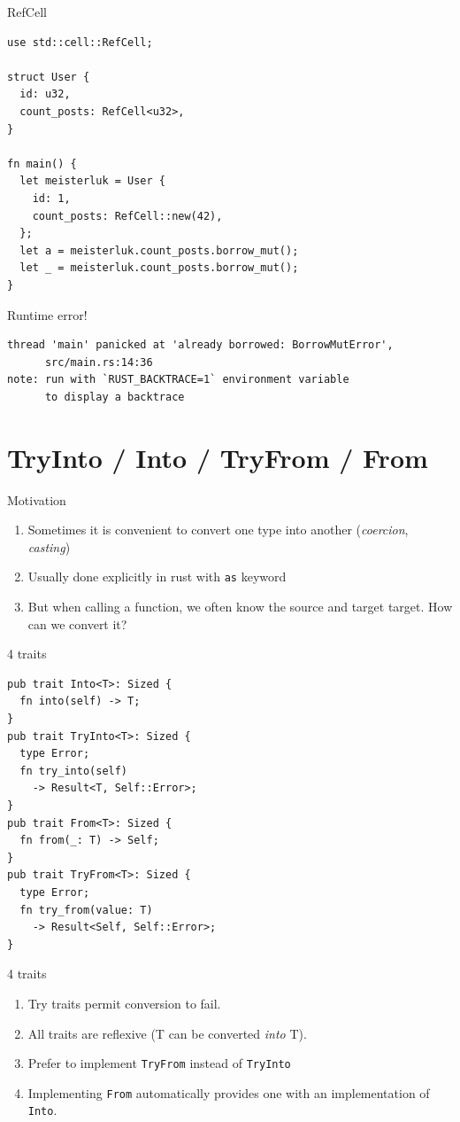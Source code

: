 \documentclass{beamer}
\begin{document}
\begin{frame}[fragile]{RefCell}
  \begin{verbatim}
use std::cell::RefCell;

struct User {
  id: u32,
  count_posts: RefCell<u32>,
}

fn main() {
  let meisterluk = User {
    id: 1,
    count_posts: RefCell::new(42),
  };
  let a = meisterluk.count_posts.borrow_mut();
  let _ = meisterluk.count_posts.borrow_mut();
}
  \end{verbatim}

  Runtime error!
  \begin{verbatim}
thread 'main' panicked at 'already borrowed: BorrowMutError',
      src/main.rs:14:36
note: run with `RUST_BACKTRACE=1` environment variable
      to display a backtrace    
  \end{verbatim}
\end{frame}

\section{TryInto / Into / TryFrom / From}

\begin{frame}[fragile]{Motivation}
  \begin{enumerate}
    \item Sometimes it is convenient to convert one type into another (\emph{coercion}, \emph{casting})
    \item Usually done explicitly in rust with \texttt{as} keyword
    \item But when calling a function, we often know the source and target target. How can we convert it?
  \end{enumerate}
\end{frame}

\begin{frame}[fragile]{4 traits}
  \begin{verbatim}
pub trait Into<T>: Sized {
  fn into(self) -> T;
}
pub trait TryInto<T>: Sized {
  type Error;
  fn try_into(self)
    -> Result<T, Self::Error>;
}
pub trait From<T>: Sized {
  fn from(_: T) -> Self;
}
pub trait TryFrom<T>: Sized {
  type Error;
  fn try_from(value: T)
    -> Result<Self, Self::Error>;
}
  \end{verbatim}
\end{frame}

\begin{frame}[fragile]{4 traits}
  \begin{enumerate}
    \item Try traits permit conversion to fail.
    \item All traits are reflexive (T can be converted \emph{into} T).
    \item Prefer to implement \texttt{TryFrom} instead of \texttt{TryInto}
    \item Implementing \texttt{From} automatically provides one with an implementation of \texttt{Into}.
  \end{enumerate}
\end{frame}
\end{document}
